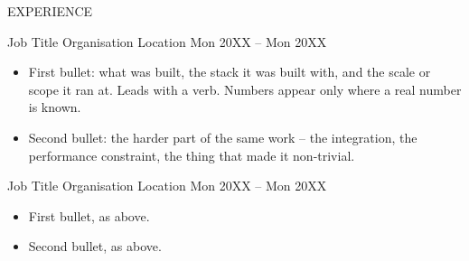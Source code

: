 \documentclass{resume} %
\begin{document}
\vspace{-2pt}


\begin{rSection}{EXPERIENCE}

\setlength{\parskip}{6pt}
\setlength{\parindent}{2pt}

\experienceHeading
{Job Title}
{Organisation}
{Location}
{Mon 20XX -- Mon 20XX}

\begin{itemize}
    \itemsep -3pt {}

    \item First bullet: what was built, the stack it was built with, and the
    scale or scope it ran at. Leads with a verb. Numbers appear only where a
    real number is known.

    \item Second bullet: the harder part of the same work -- the integration,
    the performance constraint, the thing that made it non-trivial.

\end{itemize}

\experienceHeading
{Job Title}
{Organisation}
{Location}
{Mon 20XX -- Mon 20XX}

\begin{itemize}
    \itemsep -3pt {}

    \item First bullet, as above.

    \item Second bullet, as above.

\end{itemize}

\end{rSection}

\vspace{-2pt}

\end{document}

